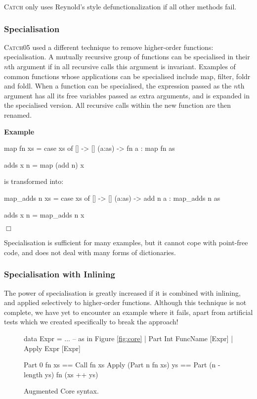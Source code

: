 \documentclass[preprint]{sigplanconf}
\newcommand{\C}[1]{\textsf{#1}}
\newcommand{\catch}{\textsc{Catch}}
\newcounter{exmp}
\newcommand{\yesexample}{\addtocounter{exmp}{1}\addvspace{2mm}\noindent\textbf{Example \arabic{exmp}}}
\newcommand{\noexample}{\hfill$\Box$\par\addvspace{2mm}}
\newenvironment{example}{\yesexample}{\noexample}
\begin{document}
\catch{} only uses Reynold's style defunctionalization if all other methods fail.


\subsubsection{Specialisation}

\catch05 used a different technique to remove higher-order functions: specialisation. A mutually recursive group of functions can be specialised in their $n$th argument if in all recursive calls this argument is invariant. Examples of common functions whose applications can be specialised include \C{map}, \C{filter}, \C{foldr} and \C{foldl}. When a function can be specialised, the expression passed as the $n$th argument has all its free variables passed as extra arguments, and is expanded in the specialised version. All recursive calls within the new function are then renamed.

\begin{example}
\begin{code}
map fn xs = case  xs of
                  []      -> []
                  (a:as)  -> fn a : map fn as

adds x n = map (add n) x
\end{code}

\noindent is transformed into:

\begin{code}
map_adds n xs = case  xs of
                      []      -> []
                      (a:as)  -> add n a : map_adds n as

adds x n = map_adds n x
\end{code}
\end{example}

Specialisation is sufficient for many examples, but it cannot cope with point-free code, and does not deal with many forms of dictionaries.

\subsubsection{Specialisation with Inlining}

The power of specialisation is greatly increased if it is combined with inlining, and applied selectively to higher-order functions. Although this technique is not complete, we have yet to encounter an example where it fails, apart from artificial tests which we created specifically to break the approach!

\begin{figure}
\begin{code}
data Expr  =  ... -- as in Figure {\ref{fig:core}}
           |  Part   Int FuncName [Expr]
           |  Apply  Expr [Expr]

Part 0 fn xs == Call fn xs
Apply (Part n fn xs) ys == Part (n - length ys) fn (xs ++ ys)
\end{code}
\caption{Augmented Core syntax.}
\label{fig:core_ho}
\end{figure}
\end{document}
